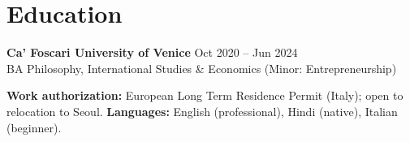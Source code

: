 \documentclass[a4paper,10pt]{article}
\begin{document}
\section{Education}
\textbf{Ca' Foscari University of Venice} \hfill Oct 2020 -- Jun 2024\\
BA Philosophy, International Studies \& Economics (Minor: Entrepreneurship)

\vspace{2pt}
{\small \textbf{Work authorization:} European Long Term Residence Permit (Italy); open to relocation to Seoul. \quad \textbf{Languages:} English (professional), Hindi (native), Italian (beginner).}
\end{document}
